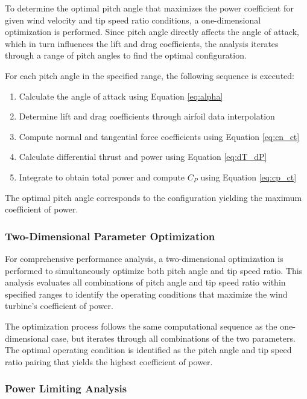 \documentclass[11pt]{article}
\begin{document}
To determine the optimal pitch angle that maximizes the power coefficient for given wind velocity and tip speed ratio conditions, a one-dimensional optimization is performed. Since pitch angle directly affects the angle of attack, which in turn influences the lift and drag coefficients, the analysis iterates through a range of pitch angles to find the optimal configuration.

For each pitch angle in the specified range, the following sequence is executed:
\begin{enumerate}
    \item Calculate the angle of attack using Equation \eqref{eq:alpha}
    \item Determine lift and drag coefficients through airfoil data interpolation
    \item Compute normal and tangential force coefficients using Equation \eqref{eq:cn_ct}
    \item Calculate differential thrust and power using Equation \eqref{eq:dT_dP}
    \item Integrate to obtain total power and compute $C_P$ using Equation \eqref{eq:cp_ct}
\end{enumerate}

The optimal pitch angle corresponds to the configuration yielding the maximum coefficient of power.

\subsubsection{Two-Dimensional Parameter Optimization}

For comprehensive performance analysis, a two-dimensional optimization is performed to simultaneously optimize both pitch angle and tip speed ratio. This analysis evaluates all combinations of pitch angle and tip speed ratio within specified ranges to identify the operating conditions that maximize the wind turbine's coefficient of power.

The optimization process follows the same computational sequence as the one-dimensional case, but iterates through all combinations of the two parameters. The optimal operating condition is identified as the pitch angle and tip speed ratio pairing that yields the highest coefficient of power.

\subsubsection{Power Limiting Analysis}
\end{document}
